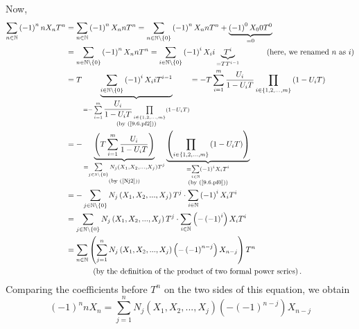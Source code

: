 \documentclass[numbers=enddot,12pt,final,onecolumn,notitlepage]{scrartcl}%
\begin{document}
Now,%
\begin{align*}
\sum_{n\in\mathbb{N}}\left(  -1\right)  ^{n}nX_{n}T^{n}  &  =\sum
_{n\in\mathbb{N}}\left(  -1\right)  ^{n}X_{n}nT^{n}=\sum_{n\in\mathbb{N}%
\setminus\left\{  0\right\}  }\left(  -1\right)  ^{n}X_{n}nT^{n}%
+\underbrace{\left(  -1\right)  ^{0}X_{0}0T^{0}}_{=0}\\
&  =\sum_{n\in\mathbb{N}\setminus\left\{  0\right\}  }\left(  -1\right)
^{n}X_{n}nT^{n}=\sum_{i\in\mathbb{N}\setminus\left\{  0\right\}  }\left(
-1\right)  ^{i}X_{i}i\underbrace{T^{i}}_{=TT^{i-1}}\ \ \ \ \ \ \ \ \ \ \left(
\text{here, we renamed }n\text{ as }i\right) \\
&  =T\underbrace{\sum_{i\in\mathbb{N}\setminus\left\{  0\right\}  }\left(
-1\right)  ^{i}X_{i}iT^{i-1}}_{\substack{=-\sum\limits_{i=1}^{m}\dfrac{U_{i}%
}{1-U_{i}T}\prod\limits_{i\in\left\{  1,2,...,m\right\}  }\left(
1-U_{i}T\right)  \\\text{(by (\ref{9.6.pf2}))}}}=-T\sum\limits_{i=1}^{m}%
\dfrac{U_{i}}{1-U_{i}T}\prod\limits_{i\in\left\{  1,2,...,m\right\}  }\left(
1-U_{i}T\right) \\
&  =-\underbrace{\left(  T\sum\limits_{i=1}^{m}\dfrac{U_{i}}{1-U_{i}T}\right)
}_{\substack{=\sum\limits_{j\in\mathbb{N}\setminus\left\{  0\right\}  }%
N_{j}\left(  X_{1},X_{2},...,X_{j}\right)  T^{j}\\\text{(by (\ref{Nj2}))}%
}}\underbrace{\left(  \prod\limits_{i\in\left\{  1,2,...,m\right\}  }\left(
1-U_{i}T\right)  \right)  }_{\substack{=\sum\limits_{i\in\mathbb{N}}\left(
-1\right)  ^{i}X_{i}T^{i}\\\text{(by (\ref{9.6.pf0}))}}}\\
&  =-\sum\limits_{j\in\mathbb{N}\setminus\left\{  0\right\}  }N_{j}\left(
X_{1},X_{2},...,X_{j}\right)  T^{j}\cdot\sum\limits_{i\in\mathbb{N}}\left(
-1\right)  ^{i}X_{i}T^{i}\\
&  =\sum\limits_{j\in\mathbb{N}\setminus\left\{  0\right\}  }N_{j}\left(
X_{1},X_{2},...,X_{j}\right)  T^{j}\cdot\sum\limits_{i\in\mathbb{N}}\left(
-\left(  -1\right)  ^{i}\right)  X_{i}T^{i}\\
&  =\sum_{n\in\mathbb{N}}\left(  \sum_{j=1}^{n}N_{j}\left(  X_{1}%
,X_{2},...,X_{j}\right)  \left(  -\left(  -1\right)  ^{n-j}\right)
X_{n-j}\right)  T^{n}\\
&  \ \ \ \ \ \ \ \ \ \ \left(  \text{by the definition of the product of two
formal power series}\right)  .
\end{align*}
Comparing the coefficients before $T^{n}$ on the two sides of this equation,
we obtain%
\[
\left(  -1\right)  ^{n}nX_{n}=\sum_{j=1}^{n}N_{j}\left(  X_{1},X_{2}%
,...,X_{j}\right)  \left(  -\left(  -1\right)  ^{n-j}\right)  X_{n-j}%
\]
\end{document}
